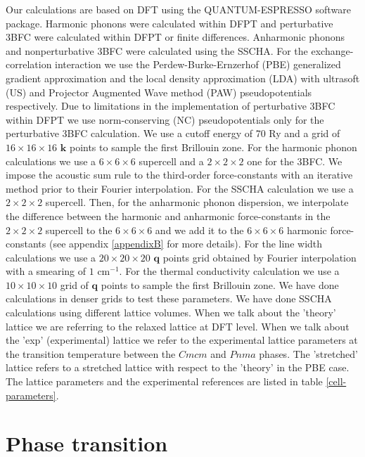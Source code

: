 Our calculations are based on DFT using the QUANTUM-ESPRESSO\cite{giannozzi2009quantum} software package. Harmonic phonons were calculated within DFPT and perturbative 3BFC were calculated within DFPT or finite 
differences\cite{li2014shengbte}. Anharmonic phonons and nonperturbative 3BFC were calculated using the SSCHA. For the exchange-correlation interaction we use the Perdew-Burke-Ernzerhof (PBE) generalized gradient 
approximation and the local density approximation (LDA) with ultrasoft (US) and Projector Augmented Wave method (PAW) pseudopotentials respectively. Due to limitations in the implementation of perturbative 3BFC 
within DFPT we use norm-conserving (NC) pseudopotentials only for the perturbative 3BFC calculation. We use a cutoff 
energy of 70 Ry and a grid of $16\times16\times16$ $\boldsymbol{k}$ points to sample the first Brillouin zone. For 
the harmonic phonon calculations we use a $6\times6\times6$ supercell and a $2\times2\times2$ one for the 3BFC. 
We impose the acoustic sum rule to the third-order force-constants with an iterative method prior to their Fourier
interpolation\cite{paulatto2013anharmonic,aseginolaza2019phonon}. For the SSCHA calculation we use a 
$2\times2\times2$ supercell. Then, for the anharmonic phonon dispersion, we 
interpolate the difference between the harmonic and anharmonic force-constants in the $2\times2\times2$ supercell to 
the $6\times6\times6$ and we add it to the $6\times6\times6$ harmonic force-constants (see appendix \ref{appendixB} 
for more details). For the line width calculations we use a $20\times20\times20$ $\boldsymbol{q}$ points grid 
obtained by Fourier interpolation with a smearing of $1$ cm$^{-1}$. For the thermal conductivity calculation we use 
a $10\times10\times10$ grid of $\boldsymbol{q}$ points to sample the first Brillouin zone. We have done calculations 
in denser grids to test these parameters. We have done SSCHA calculations using different lattice volumes. When we talk about the 'theory' lattice we are referring to the relaxed lattice at DFT level. When we talk about the 'exp' (experimental) lattice we refer to the experimental lattice parameters at the transition temperature between the $Cmcm$ and $Pnma$ phases. The 'stretched' lattice refers to a stretched lattice with respect to the 'theory' in the PBE case. The lattice parameters and the experimental references are listed in table \ref{cell-parameters}.

\section{Phase transition}

